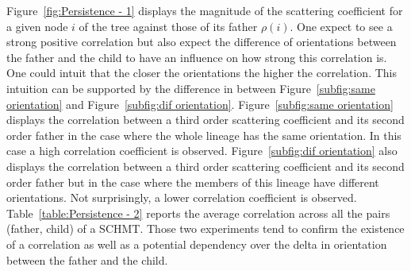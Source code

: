 \documentclass[a4paper,11pt]{report}
\begin{document}
		Figure~\ref{fig:Persistence - 1} displays the magnitude of the scattering coefficient for a given node $i$ of the tree against those of its father $\rho(i)$. One expect to see a strong positive correlation but also expect the difference of orientations between the father and the child to have an influence on how strong this correlation is. One could intuit that the closer the orientations the higher the correlation. This intuition can be supported by the difference in between Figure~\ref{subfig:same orientation} and Figure~\ref{subfig:dif orientation}. Figure~\ref{subfig:same orientation} displays the correlation between a third order scattering coefficient and its second order father in the case where the whole lineage has the same orientation. In this case a high correlation coefficient is observed. Figure~\ref{subfig:dif orientation} also displays the correlation between a third order scattering coefficient and its second order father but in the case where the members of this lineage have different orientations. Not surprisingly, a lower correlation coefficient is observed. Table~\ref{table:Persistence - 2} reports the average correlation across all the pairs (father, child) of a SCHMT. Those two experiments tend to confirm the existence of a correlation  as well as a potential dependency over the delta in orientation between the father and the child. 
		
\end{document}

